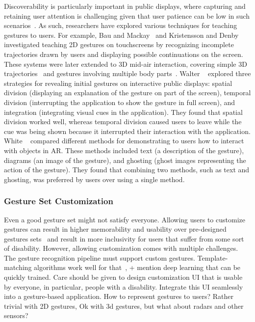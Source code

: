 Discoverability is particularly important in public displays, where capturing and retaining user attention is challenging given that user patience can be low in such scenarios~\cite{Walter:2013}.
%
As such, researchers have explored various techniques for teaching gestures to users.
%
For example, Bau and Mackay~\cite{Bau:2008} and Kristensson and Denby~\cite{Kristensson:2011} investigated teaching 2D gestures on touchscreens by recognizing incomplete trajectories drawn by users and displaying possible continuations on the screen.
%
These systems were later extended to 3D mid-air interaction, covering simple 3D trajectories~\cite{Fennedy:2021} and gestures involving multiple body parts~\cite{Rovelo:2015, Alt:2018}. 
%
Walter \etal~\cite{Walter:2013} explored three strategies for revealing initial gestures on interactive public displays: spatial division (\ie displaying an explanation of the gesture on part of the screen), temporal division (interrupting the application to show the gesture in full screen), and integration (integrating visual cues in the application). They found that spatial division worked well, whereas temporal division caused users to leave while the cue was being shown because it interrupted their interaction with the application.
%
White \etal~\cite{White:2007} compared different methods for demonstrating to users how to interact with objects in AR. These methods included text (\ie a description of the gesture), diagrams (\ie an image of the gesture), and ghosting (\ie ghost images representing the action of the gesture). They found that combining two methods, such as text and ghosting, was preferred by users over using a single method.


\subsubsection{Gesture Set Customization}
Even a good gesture set might not satisfy everyone. Allowing users to customize gestures can result in higher memorability and usability over pre-designed gestures sets~\cite{Oh:2013,Nacenta:2013} and result in more inclusivity for users that suffer from some sort of disability.
% 
However, allowing customization comes with multiple challenges.
The gesture recognition pipeline must support custom gestures. Template-matching algorithms work well for that~\cite{TODO}, + mention deep learning that can be quickly trained.
Care should be given to design customization UI that is usable by everyone, in particular, people with a disability. Integrate this UI seamlessly into a gesture-based application.
How to represent gestures to users? Rather trivial with 2D gestures, Ok with 3d gestures, but what about radars and other sensors?

